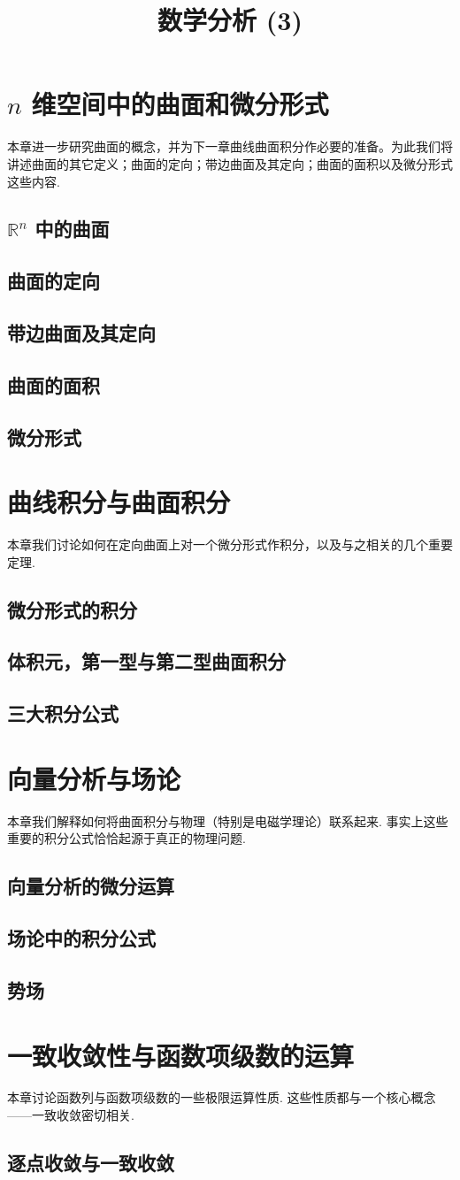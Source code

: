 \documentclass{ctexrep}
\title{数学分析 (3)}
\theoremstyle{examplestyle}
\theoremstyle{hintstyle}
\newcommand{\mychapter}[1]{{\color{mydarkblue}\chapter{#1}}}
\newcommand{\mysection}[1]{{\color{mydarkblue}\section{#1}}}
\newcommand{\RR}{\mathbb{R}}
\begin{document}
\maketitle
\tableofcontents

\setcounter{chapter}{11}
\mychapter{$n$ 维空间中的曲面和微分形式}

本章进一步研究曲面的概念，并为下一章曲线曲面积分作必要的准备。为此我们将讲述曲面的其它定义；曲面的定向；带边曲面及其定向；曲面的面积以及微分形式这些内容.

\mysection{$\RR^n$ 中的曲面}



\mysection{曲面的定向}



\mysection{带边曲面及其定向}



\mysection{曲面的面积}



\mysection{微分形式}



\mychapter{曲线积分与曲面积分}

本章我们讨论如何在定向曲面上对一个微分形式作积分，以及与之相关的几个重要定理.

\mysection{微分形式的积分}



\mysection{体积元，第一型与第二型曲面积分}



\mysection{三大积分公式}



\mychapter{向量分析与场论}

本章我们解释如何将曲面积分与物理（特别是电磁学理论）联系起来. 事实上这些重要的积分公式恰恰起源于真正的物理问题.

\mysection{向量分析的微分运算}



\mysection{场论中的积分公式}



\mysection{势场}



\setcounter{chapter}{15}
\mychapter{一致收敛性与函数项级数的运算}

本章讨论函数列与函数项级数的一些极限运算性质. 这些性质都与一个核心概念——一致收敛密切相关.

\mysection{逐点收敛与一致收敛}


\end{document}
